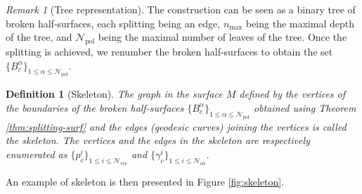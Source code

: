 \documentclass{article}
\newcommand{\surf}{M}
\newcommand{\halfP}{B}
\newcommand{\Nver}{\mathcal{N}_{\mathrm{ver}}}
\newcommand{\Ned}{\mathcal{N}_{\mathrm{ed}}}
\newcommand{\Npol}{\mathcal{N}_{\mathrm{pol}}}
\newtheorem{definitionE}[theorem]{Definition}
\theoremstyle{remark}
\newtheorem{remarkE}[theorem]{Remark}
\theoremstyle{prpart}
\begin{document}
\begin{remarkE}[Tree representation]\label{rem:binary-tree}
  The construction can be seen as a binary tree of broken half-surfaces, each splitting being an edge, $n_{\max}$ being the maximal depth of the tree, and $\Npol$ being the maximal number of leaves of the tree. Once the splitting is achieved, we renumber the broken half-surfaces to obtain the set $\{\halfP_c^\alpha\}_{1\leq\alpha\leq\Npol}$.
\end{remarkE}
\begin{definitionE}[Skeleton]
  The graph in the surface $\surf$ defined by the vertices of the boundaries of the broken half-surfaces $\{\halfP^\alpha_c\}_{1\leq\alpha\leq\Npol}$ obtained using Theorem \ref{thm:splitting-surf} and the edges (geodesic curves) joining the vertices is called the \emph{skeleton}. The vertices and the edges in the \emph{skeleton} are respectively enumerated as $\{p_c^i\}_{1\leq i\leq \Nver}$ and $\{\gamma_c^i\}_{1\leq i\leq \Ned}$.
\end{definitionE}
An example of skeleton is then presented in Figure \ref{fig:skeleton}.
\end{document}
